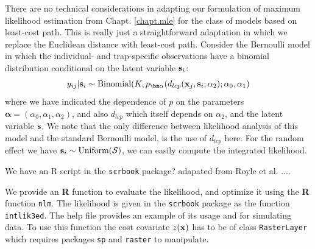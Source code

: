 There are no technical considerations in adapting our
 formulation of maximum likelihood estimation
\citep{borchers_efford:2008} from Chapt. \ref{chapt.mle} for the class
of models based on least-cost path. This is really just a
straightforward adaptation in which we replace the Euclidean distance
with least-cost path.
Consider the Bernoulli model in which 
the individual- and trap-specific observations have a binomial
distribution conditional on the latent variable ${\bf s}_{i}$:
\begin{equation}
  y_{ij}| {\bf s}_{i} \sim \mbox{Binomial}(K, p_{\bm \alpha}(d_{lcp}({\bf x}_{j},{\bf s}_{i};\alpha_{2}); \alpha_{0}, \alpha_{1})
\label{ecoldist.eq.cond-on-s}
\end{equation}
where we have indicated the dependence of $p$ on the parameters
${\bm \alpha} =(\alpha_{0},\alpha_{1},\alpha_{2})$, and also $d_{lcp}$ which
itself depends on $\alpha_{2}$, and the latent variable ${\bf s}$.
We note that the only difference between likelihood analysis of this
model and the standard Bernoulli model, is the use of $d_{lcp}$ here. 
For the random effect we have ${\bf s}_{i} \sim  \mbox{Uniform}({\cal
  S})$, we can easily compute the integrated likelihood.

We have an R script in the \mbox{\tt scrbook} package?
adapated from Royle et al. ....

We provide an {\bf R} function to evaluate the likelihood, and
optimize it 
using the {\bf R} function \mbox{\tt nlm}.
The likelihood is given in the {\tt scrbook} package as the function
\mbox{\tt intlik3ed}. The help file
provides an example of its usage and for simulating data.
To use this function the cost covariate $z({\bf x})$ has to be of class
\mbox{\tt RasterLayer} which requires packages \mbox{\tt sp} and
\mbox{\tt raster} to manipulate.

